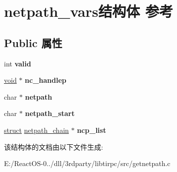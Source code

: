 \hypertarget{structnetpath__vars}{}\section{netpath\+\_\+vars结构体 参考}
\label{structnetpath__vars}
\subsection*{Public 属性}
\begin{DoxyCompactItemize}
\item 
\mbox{\label{structnetpath__vars_acc94ae31f6d1741af00c60b4d461be03}} 
int {\bfseries valid}
\item 
\mbox{\label{structnetpath__vars_ad2c3d4f20bb7617fd6ff7221078e5dad}} 
\hyperlink{interfacevoid}{void} $\ast$ {\bfseries nc\+\_\+handlep}
\item 
\mbox{\label{structnetpath__vars_aef4d2ac80e8ac23ddf24c18788220164}} 
char $\ast$ {\bfseries netpath}
\item 
\mbox{\label{structnetpath__vars_a9a06f216f4f8f03d3767cbda2528ab3d}} 
char $\ast$ {\bfseries netpath\+\_\+start}
\item 
\mbox{\label{structnetpath__vars_acf7096274beddf21d7c9c26d2265a98f}} 
\hyperlink{interfacestruct}{struct} \hyperlink{structnetpath__chain}{netpath\+\_\+chain} $\ast$ {\bfseries ncp\+\_\+list}
\end{DoxyCompactItemize}


该结构体的文档由以下文件生成\+:\begin{DoxyCompactItemize}
\item 
E\+:/\+React\+O\+S-\/0../dll/3rdparty/libtirpc/src/getnetpath.\+c\end{DoxyCompactItemize}
